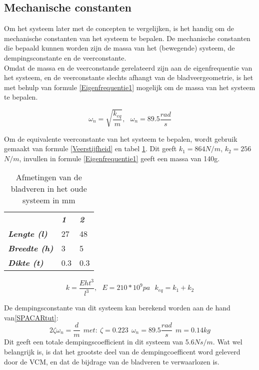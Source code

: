 \documentclass[a4paper]{article}
\begin{document}
\subsection{Mechanische constanten}
Om het systeem later met de concepten te vergelijken, is het handig om de mechanische constanten van het systeem te bepalen. De mechanische constanten die bepaald kunnen worden zijn de massa van het (bewegende) systeem, de dempingsconstante en de veerconstante.  \\ 

Omdat de massa en de veerconstande gerelateerd zijn aan de eigenfrequentie van het systeem, en de veerconstante slechts afhangt van de bladveergeometrie, is het met behulp van formule \ref{Eigenfrequentie1} mogelijk om de massa van het systeem te bepalen. 

\begin{equation}
\omega_n=\sqrt{\frac{k_{eq}}{m}}, \ \ \ \omega_n= 89.5 \frac{rad}{s}
\label{Eigenfrequentie1}
\end{equation}

Om de equivalente veerconstante van het systeem te bepalen, wordt gebruik gemaakt van formule \ref{Veerstijfheid} en tabel \ref{bladveermaten}. Dit geeft $k_1=864$$N/m$, $k_2=256$$N/m$, invullen in formule \ref{Eigenfrequentie1} geeft een massa van 140g.
\\
\begin{table}[h]
\label{bladveermaten}
\begin{tabular}{lll}
                              & \textit{\textbf{1}} & \textit{\textbf{2}} \\
\textit{\textbf{Lengte (l)}}  & 27                  & 48                  \\
\textit{\textbf{Breedte (h)}} & 3                   & 5                   \\
\textit{\textbf{Dikte (t)}}   & 0.3                 & 0.3                
\end{tabular}
\caption{Afmetingen van de bladveren in het oude systeem in mm}
\end{table}
 
\begin{equation}
k=\frac{Eht^3}{l^3}, \ \ \ E = 210*10^9 pa \ \ \ k_{eq}=k_1+k_2
\label{Veerstijfheid} 
\end{equation} 

 De dempingsconstante van dit systeem kan  berekend worden aan de hand van\ref{SPACARtut}:
\begin{equation}
2\zeta\omega_n=\frac{d}{m} \ \ met: \ \zeta = 0.223 \ \ \omega_n = 89.5 \frac{rad}{s} \ \ m = 0.14 kg
\end{equation} 
Dit geeft een totale dempingscoefficient in dit systeem van 5.6$Ns/m$. Wat wel belangrijk is, is dat het grootste deel van de dempingcoefficent word geleverd  door de VCM, en dat de bijdrage van de bladveren te verwaarlozen is.\\
\end{document}
